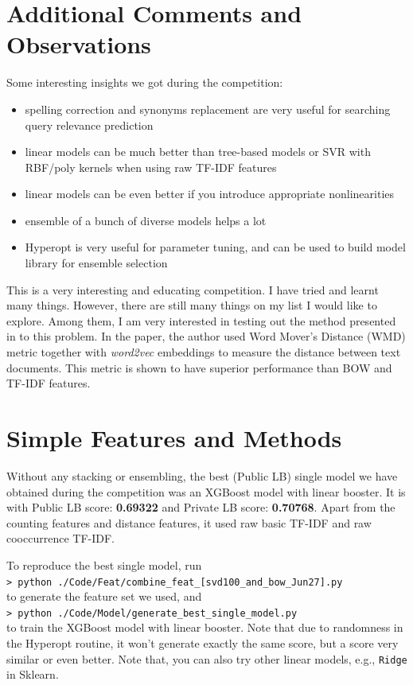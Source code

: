 \documentclass[12pt]{article}
\begin{document}
\section{Additional Comments and Observations}
Some interesting insights we got during the competition:
\begin{itemize}
\item spelling correction and synonyms replacement are very useful for searching query relevance prediction
\item linear models can be much better than tree-based models or SVR with RBF/poly kernels when using raw TF-IDF features
\item linear models can be even better if you introduce appropriate nonlinearities
\item ensemble of a bunch of diverse models helps a lot
\item Hyperopt is very useful for parameter tuning, and can be used to build model library for ensemble selection
\end{itemize}

This is a very interesting and educating competition. I have tried and learnt many things. However, there are still many things on my list I would like to explore. Among them, I am very interested in testing out the method presented in \cite{wmd} to this problem. In the paper, the author used Word Mover's Distance (WMD) metric together with \emph{word2vec} embeddings to measure the distance between text documents. This metric is shown to have superior performance than BOW and TF-IDF features.

\section{Simple Features and Methods}
Without any stacking or ensembling, the best (Public LB) single model we have obtained during the competition was an XGBoost model with linear booster. It is with Public LB score: \textbf{0.69322} and Private LB score: \textbf{0.70768}. Apart from the counting features and distance features, it used raw basic TF-IDF and raw cooccurrence TF-IDF.

To reproduce the best single model, run\\
\texttt{> python ./Code/Feat/combine\_feat\_[svd100\_and\_bow\_Jun27].py}\\
to generate the feature set we used, and\\
\texttt{> python ./Code/Model/generate\_best\_single\_model.py}\\
to train the XGBoost model with linear booster. Note that due to randomness in the Hyperopt routine, it won't generate exactly the same score, but a score very similar or even better. Note that, you can also try other linear models, e.g., \texttt{Ridge} in Sklearn.
\end{document}
